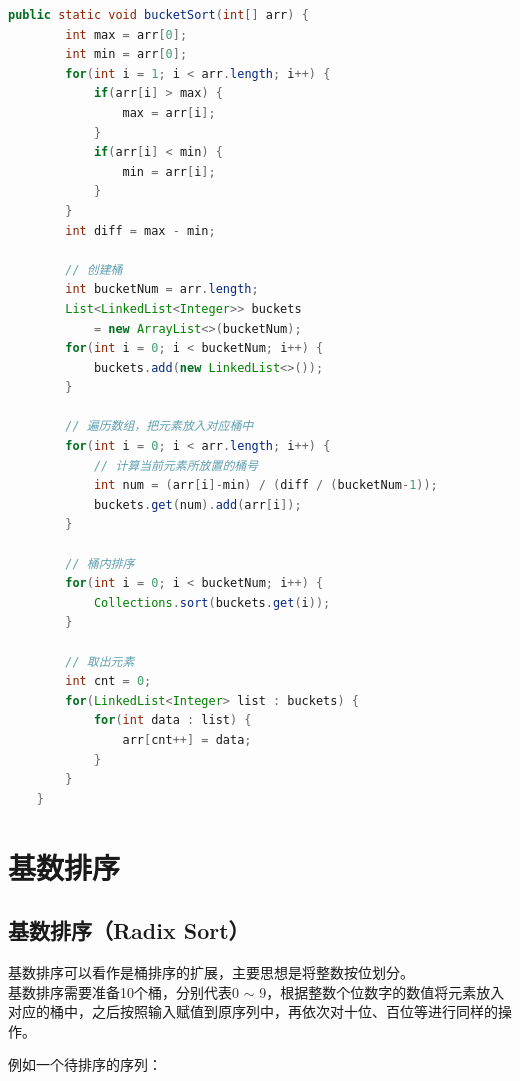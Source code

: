 \begin{lstlisting}[language=Java]
public static void bucketSort(int[] arr) {
        int max = arr[0];
        int min = arr[0];
        for(int i = 1; i < arr.length; i++) {
            if(arr[i] > max) {
                max = arr[i];
            }
            if(arr[i] < min) {
                min = arr[i];
            }
        }
        int diff = max - min;

        // 创建桶
        int bucketNum = arr.length;
        List<LinkedList<Integer>> buckets 
            = new ArrayList<>(bucketNum);
        for(int i = 0; i < bucketNum; i++) {
            buckets.add(new LinkedList<>());
        }

        // 遍历数组，把元素放入对应桶中
        for(int i = 0; i < arr.length; i++) {
            // 计算当前元素所放置的桶号
            int num = (arr[i]-min) / (diff / (bucketNum-1));
            buckets.get(num).add(arr[i]);
        }

        // 桶内排序
        for(int i = 0; i < bucketNum; i++) {
            Collections.sort(buckets.get(i));
        }

        // 取出元素
        int cnt = 0;
        for(LinkedList<Integer> list : buckets) {
            for(int data : list) {
                arr[cnt++] = data;
            }
        }
    }
\end{lstlisting}

\newpage

\section{基数排序}

\subsection{基数排序（Radix Sort）}

基数排序可以看作是桶排序的扩展，主要思想是将整数按位划分。 \\

基数排序需要准备10个桶，分别代表0 $ \sim $ 9，根据整数个位数字的数值将元素放入对应的桶中，之后按照输入赋值到原序列中，再依次对十位、百位等进行同样的操作。

例如一个待排序的序列：

\begin{figure}[H]
    \centering
\end{figure}

